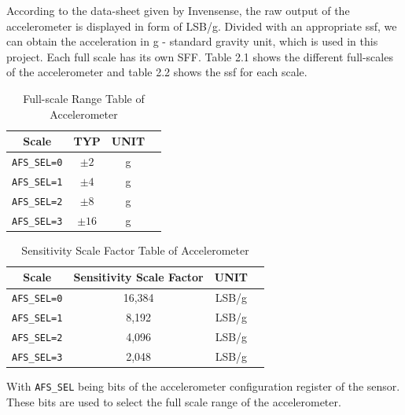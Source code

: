 \documentclass[letterpaper,12pt,titlepage,oneside,final]{book}
\let\origdoublepage\cleardoublepage
\newcommand{\clearemptydoublepage}{%
	\clearpage{\pagestyle{empty}\origdoublepage}}
\let\cleardoublepage\clearemptydoublepage
\begin{document}
According to the data-sheet given by Invensense\textregistered, the raw output of the accelerometer is displayed in form of LSB/g. Divided with an appropriate \gls{ssf}, we can obtain the acceleration in g - standard gravity unit, which is used in this project. Each full scale has its own SFF. Table 2.1 shows the different full-scales of the accelerometer and table 2.2 shows the \gls{ssf} for each scale.
\cleardoublepage
\begin{table}[h!]
	\begin{center}
		\begin{tabular}{ |c|c|c|c| } 
			\hline
			Scale & TYP & UNIT \\
			\hline
			\verb|AFS_SEL=0| & $\pm2$ & g \\ 
			\verb|AFS_SEL=1|& $\pm4$ & g \\ 
			\verb|AFS_SEL=2|& $\pm8$ & g \\
			\verb|AFS_SEL=3|& $\pm16$ & g\\
			\hline
		\end{tabular}
		\caption{Full-scale Range Table of Accelerometer}
		\label{table:1}
	\end{center}
\end{table}
\begin{table}[h!]
	\begin{center}
		\begin{tabular}{ |c|c|c|c| } 
			\hline
			Scale & Sensitivity Scale Factor & UNIT \\
			\hline
			\verb|AFS_SEL=0| & 16,384 & LSB/g \\ 
			\verb|AFS_SEL=1|& 8,192 & LSB/g \\ 
			\verb|AFS_SEL=2|& 4,096 & LSB/g \\
			\verb|AFS_SEL=3|& 2,048 & LSB/g\\
			\hline
		\end{tabular}
		\caption{Sensitivity Scale Factor Table of Accelerometer}
		\label{table:1}
	\end{center}
\end{table}
With \verb|AFS_SEL| being bits of the accelerometer configuration register of the sensor. These bits are used to select the full scale range of the accelerometer. \par 
\end{document}
